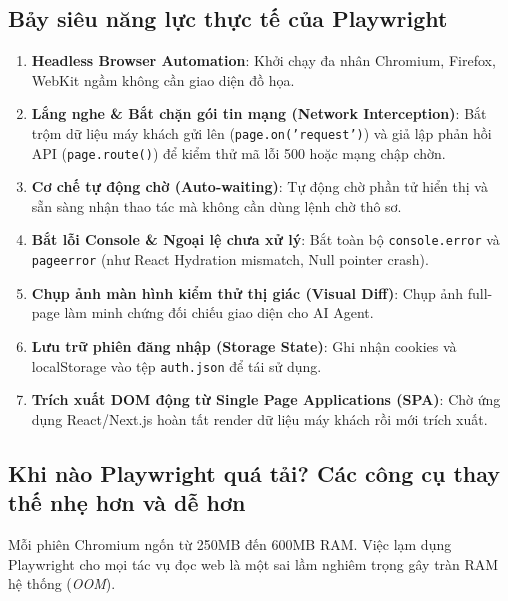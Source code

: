\documentclass[a4paper,11pt]{report}
\begin{document}
\subsection{Bảy siêu năng lực thực tế của Playwright}
\begin{enumerate}[label={\arabic*.}]
    \item \textbf{Headless Browser Automation}: Khởi chạy đa nhân Chromium, Firefox, WebKit ngầm không cần giao diện đồ họa.
    \item \textbf{Lắng nghe \& Bắt chặn gói tin mạng (Network Interception)}: Bắt trộm dữ liệu máy khách gửi lên (\texttt{page.on('request')}) và giả lập phản hồi API (\texttt{page.route()}) để kiểm thử mã lỗi 500 hoặc mạng chập chờn.
    \item \textbf{Cơ chế tự động chờ (Auto-waiting)}: Tự động chờ phần tử hiển thị và sẵn sàng nhận thao tác mà không cần dùng lệnh chờ thô sơ.
    \item \textbf{Bắt lỗi Console \& Ngoại lệ chưa xử lý}: Bắt toàn bộ \texttt{console.error} và \texttt{pageerror} (như React Hydration mismatch, Null pointer crash).
    \item \textbf{Chụp ảnh màn hình kiểm thử thị giác (Visual Diff)}: Chụp ảnh full-page làm minh chứng đối chiếu giao diện cho AI Agent.
    \item \textbf{Lưu trữ phiên đăng nhập (Storage State)}: Ghi nhận cookies và localStorage vào tệp \texttt{auth.json} để tái sử dụng.
    \item \textbf{Trích xuất DOM động từ Single Page Applications (SPA)}: Chờ ứng dụng React/Next.js hoàn tất render dữ liệu máy khách rồi mới trích xuất.
\end{enumerate}

\subsection{Khi nào Playwright quá tải? Các công cụ thay thế nhẹ hơn và dễ hơn}
Mỗi phiên Chromium ngốn từ 250MB đến 600MB RAM. Việc lạm dụng Playwright cho mọi tác vụ đọc web là một sai lầm nghiêm trọng gây tràn RAM hệ thống (\textit{OOM}).
\end{document}
